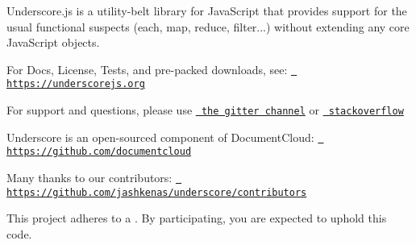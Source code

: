 Underscore.\+js is a utility-\/belt library for Java\+Script that provides support for the usual functional suspects (each, map, reduce, filter...) without extending any core Java\+Script objects.

For Docs, License, Tests, and pre-\/packed downloads, see\+: \href{https://underscorejs.org}{\texttt{ https\+://underscorejs.\+org}}

For support and questions, please use \href{https://gitter.im/jashkenas/underscore}{\texttt{ the gitter channel}} or \href{https://stackoverflow.com/search?q=underscore.js}{\texttt{ stackoverflow}}

Underscore is an open-\/sourced component of Document\+Cloud\+: \href{https://github.com/documentcloud}{\texttt{ https\+://github.\+com/documentcloud}}

Many thanks to our contributors\+: \href{https://github.com/jashkenas/underscore/contributors}{\texttt{ https\+://github.\+com/jashkenas/underscore/contributors}}

This project adheres to a . By participating, you are expected to uphold this code. 